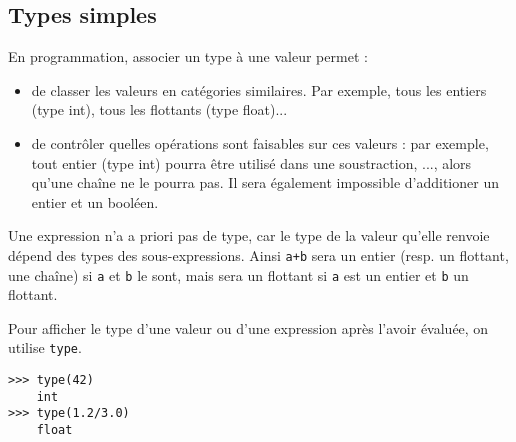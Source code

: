 \subsection{Types simples}

En programmation, associer un type à une valeur permet :
\begin{itemize}
\item de classer les valeurs en catégories similaires. Par exemple, tous les
entiers (type int), tous les flottants (type float)...
\item de contrôler quelles opérations sont faisables sur ces valeurs : par
exemple, tout entier (type int) pourra être utilisé dans une soustraction, ..., alors 
qu'une chaîne ne le pourra pas. Il sera également impossible d'additioner un entier et un booléen. 
                                     
\end{itemize}

Une expression n'a a priori pas de type, car le type de la valeur qu'elle renvoie dépend des types 
des sous-expressions. Ainsi \texttt{a+b} sera un entier (resp. un flottant, une chaîne) si 
\texttt{a} et \texttt{b} le sont, mais sera un flottant si \texttt{a} est un entier et \texttt{b} 
un flottant.


Pour afficher le type d'une valeur ou d'une expression après l'avoir évaluée, on utilise 
\texttt{type}. 
\begin{lstlisting}
>>> type(42)
	int
>>> type(1.2/3.0)
	float
\end{lstlisting}





